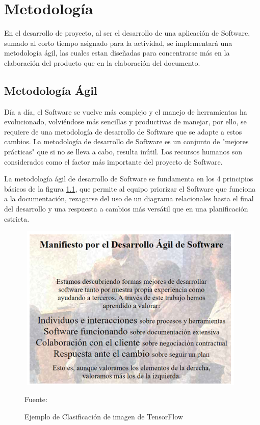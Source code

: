 \chapter{Metodología}

En el desarrollo de proyecto, al ser el desarrollo de una aplicación de Software, sumado al corto tiempo asignado para la actividad, se implementará una metodología ágil, las cuales estan diseñadas para concentrarse más en la elaboración del producto que en la elaboración del documento.

\section{Metodología Ágil}

Día a día, el Software se vuelve más complejo y el manejo de herramientas ha evolucionado, volviéndose más sencillas y productivas de manejar, por ello, se requiere de una metodología de desarrollo de Software que se adapte a estos cambios.
La metodología de desarrollo de Software es un conjunto de "mejores prácticas" que si no se lleva a cabo, resulta inútil\cite{carrizo2018metodo}. Los recursos humanos son considerados como el factor más importante del proyecto de Software.

La metodología ágil de desarrollo de Software se fundamenta en los 4 principios básicos de la figura \ref{manifiesto}, que permite al equipo priorizar el Software que funciona a la documentación, rezagarse del uso de un diagrama relacionales hasta el final del desarrollo y una respuesta a cambios más versátil que en una planificación estricta.
\\
\begin{figure}[t!]
	\centering
	\includegraphics[width=11cm,height=8cm,]{./Images/manifiesto.png}
	\caption{Ejemplo de Clasificación de imagen de TensorFlow}
	\footnotesize Fuente: \cite{beck2001manifiesto}
	\label{manifiesto}
\end{figure}

